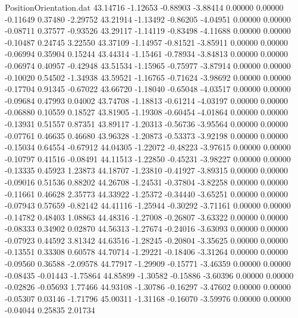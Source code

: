 \begin{filecontents}{PositionOrientation.dat}
  43.14716   -1.12653   -0.88903    -3.88414    0.00000    0.00000   -0.11649    0.37480   -2.29752
  43.21914   -1.13492   -0.86205    -4.04951    0.00000    0.00000   -0.08711    0.37577   -0.93526
  43.29117   -1.14119   -0.83498    -4.11688    0.00000    0.00000   -0.10487    0.24745    3.22550
  43.37109   -1.14957   -0.81521    -3.85911    0.00000    0.00000   -0.06994    0.35904    0.15244
  43.44314   -1.15461   -0.78934    -3.84813    0.00000    0.00000   -0.06974    0.40957   -0.42948
  43.51534   -1.15965   -0.75977    -3.87914    0.00000    0.00000   -0.10020    0.54502   -1.34938
  43.59521   -1.16765   -0.71624    -3.98692    0.00000    0.00000   -0.17704    0.91345   -0.67022
  43.66720   -1.18040   -0.65048    -4.03517    0.00000    0.00000   -0.09684    0.47993    0.04002
  43.74708   -1.18813   -0.61214    -4.03197    0.00000    0.00000   -0.06880    0.10559    0.18527
  43.81905   -1.19308   -0.60454    -4.01864    0.00000    0.00000   -0.13931    0.51557    0.87351
  43.89117   -1.20313   -0.56736    -3.95564    0.00000    0.00000   -0.07761    0.46635    0.46680
  43.96328   -1.20873   -0.53373    -3.92198    0.00000    0.00000   -0.15034    0.64554   -0.67912
  44.04305   -1.22072   -0.48223    -3.97615    0.00000    0.00000   -0.10797    0.41516   -0.08491
  44.11513   -1.22850   -0.45231    -3.98227    0.00000    0.00000   -0.13335    0.45923    1.23873
  44.18707   -1.23810   -0.41927    -3.89315    0.00000    0.00000   -0.09016    0.51536    0.88202
  44.26708   -1.24531   -0.37804    -3.82258    0.00000    0.00000   -0.11661    0.46628    2.35773
  44.33922   -1.25372   -0.34440    -3.65251    0.00000    0.00000   -0.07943    0.57659   -0.82142
  44.41116   -1.25944   -0.30292    -3.71161    0.00000    0.00000   -0.14782    0.48403    1.08863
  44.48316   -1.27008   -0.26807    -3.63322    0.00000    0.00000   -0.08333    0.34902    0.02870
  44.56313   -1.27674   -0.24016    -3.63093    0.00000    0.00000   -0.07923    0.44592    3.81342
  44.63516   -1.28245   -0.20804    -3.35625    0.00000    0.00000   -0.13551    0.33308    0.60578
  44.70714   -1.29221   -0.18406    -3.31264    0.00000    0.00000   -0.09560    0.36588   -2.09578
  44.77917   -1.29909   -0.15771    -3.46359    0.00000    0.00000   -0.08435   -0.01443   -1.75864
  44.85899   -1.30582   -0.15886    -3.60396    0.00000    0.00000   -0.02826   -0.05693    1.77466
  44.93108   -1.30786   -0.16297    -3.47602    0.00000    0.00000   -0.05307    0.03146   -1.71796
  45.00311   -1.31168   -0.16070    -3.59976    0.00000    0.00000   -0.04044    0.25835    2.01734

\end{filecontents}
